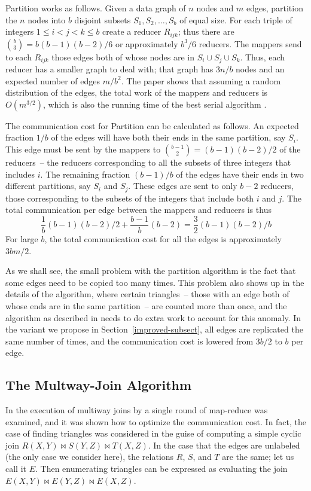 Partition works as follows.
Given a data graph of $n$ nodes and $m$ edges, partition the $n$ nodes into $b$ disjoint subsets $S_1,S_2,\ldots,S_b$ of equal size.  For each triple of integers $1\le i<j<k\le b$ create a reducer $R_{ijk}$; thus there are
$\binom{b}{3} = b(b-1)(b-2)/6$
or approximately $b^3/6$ reducers.  The mappers send to each $R_{ijk}$ those edges both of whose nodes are in $S_i\cup S_j\cup S_k$.  Thus, each reducer has a smaller graph to deal with; that graph has $3n/b$ nodes and an expected number of edges $m/b^2$.  The paper \cite{SV11} shows that assuming a random distribution of the edges, the total work of the mappers and reducers is $O(m^{3/2})$, which is also the running time of the best serial algorithm \cite{Schank07}.

The communication cost for Partition can be calculated as fol\-lows.  An expected fraction $1/b$ of the edges will have both their ends in the same partition, say $S_i$.  This edge must be sent by the mappers to $\binom{b-1}{2} = (b-1)(b-2)/2$ of the reducers~-- the reducers corresponding to all the subsets of three integers that includes $i$.  The remaining fraction $(b-1)/b$ of the edges have their ends in two different partitions, say $S_i$ and $S_j$.  These edges are sent to only $b-2$ reducers, those corresponding to the subsets of the integers that include both $i$ and $j$.
The total communication per edge between the mappers and reducers is thus
$$\frac1b (b-1)(b-2)/2 + \frac{b-1}{b} (b-2) = \frac32(b-1)(b-2)/b$$
For large $b$, the total communication cost for all the edges is approximately $3bm/2$.

As we shall see, the small problem with the partition algorithm is the fact that some edges need to be copied too many times.  This problem also shows up in the details of the algorithm, where certain triangles~-- those with an edge both of whose ends are in the same partition~-- are counted more than once, and the algorithm as described in \cite{SV11} needs to do extra work to account for this anomaly.  In the variant we propose in Section~\ref{improved-subsect}, all edges are replicated the same number of times, and the communication cost is lowered from $3b/2$ to $b$ per edge.

\subsection{The Multway-Join Algorithm}
\label{mj-subsect}

In \cite{AU10} the execution of multiway joins by a single round of map-reduce was examined, and it was shown how to optimize the communication cost.  In fact, the case of finding triangles was considered in the guise of computing a simple cyclic join $R(X,Y)\bowtie S(Y,Z)\bowtie T(X,Z)$.  In the case that the edges are unlabeled (the only case we consider here), the relations $R$, $S$, and $T$ are the same; let us call it $E$.  Then enumerating triangles can be expressed as evaluating the join
$E(X,Y)\bowtie E(Y,Z)\bowtie E(X,Z)$.

